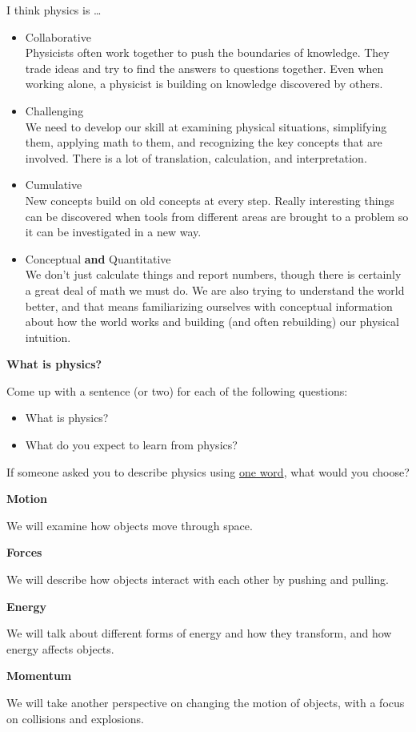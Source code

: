 \documentclass[]{article}
\begin{document}
\newpage
\begin{TeacherMargin}
\noindent I think physics is \dots
\begin{itemize}
	\item Collaborative \\ Physicists often work together to push the boundaries of knowledge. They trade ideas and try to find the answers to questions together. Even when working alone, a physicist is building on knowledge discovered by others.
	\item Challenging \\ We need to develop our skill at examining physical situations, simplifying them, applying math to them, and recognizing the key concepts that are involved. There is a lot of translation, calculation, and interpretation.
	\item Cumulative \\ New concepts build on old concepts at every step. Really interesting things can be discovered when tools from different areas are brought to a problem so it can be investigated in a new way.
	\item Conceptual \textbf{and} Quantitative \\ We don't just calculate things and report numbers, though there is certainly a great deal of math we must do. We are also trying to understand the world better, and that means familiarizing ourselves with conceptual information about how the world works and building (and often rebuilding) our physical intuition.
\end{itemize}
\end{TeacherMargin}
\begin{PresentSpace}
\begin{center}
	\textbf{What is physics?}
\end{center}
Come up with a sentence (or two) for each of the following questions:
\begin{itemize}
	\item What is physics?
	\item What do you expect to learn from physics?
\end{itemize}
If someone asked you to describe physics using \underline{one word}, what would you choose?
\end{PresentSpace}
\newpage
\begin{TeacherMargin}
\noindent\textbf{Motion}

We will examine how objects move through space.

\noindent\textbf{Forces}

We will describe how objects interact with each other by pushing and pulling.

\noindent\textbf{Energy}

We will talk about different forms of energy and how they transform, and how energy affects objects.

\noindent\textbf{Momentum}

We will take another perspective on changing the motion of objects, with a focus on collisions and explosions.

\end{TeacherMargin}
\end{document}
